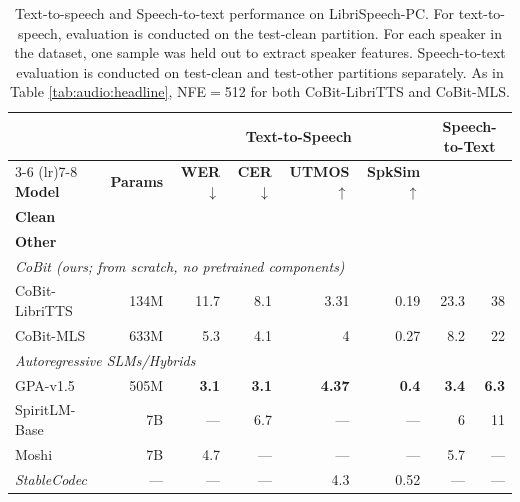 \begin{table}[t]
\centering
\small
\setlength{\tabcolsep}{4.5pt}
\begin{tabular}{lrrrrrrr}
\toprule
& & \multicolumn{4}{c}{\textbf{Text-to-Speech}} & \multicolumn{2}{c}{\textbf{Speech-to-Text}} \\
\cmidrule(lr){3-6} \cmidrule(lr){7-8}
\textbf{Model} & \textbf{Params} & \textbf{WER}$\downarrow$ & \textbf{CER}$\downarrow$ & \textbf{UTMOS}$\uparrow$ & \textbf{SpkSim}$\uparrow$ & \makecell{\textbf{WER}$\downarrow$ \\ \textbf{Clean}} & \makecell{\textbf{WER}$\downarrow$ \\ \textbf{Other}} \\
\midrule
\multicolumn{8}{l}{\emph{CoBit (ours; from scratch, no pretrained components)}} \\
CoBit-LibriTTS & 134M & 11.7 & 8.1 & 3.31 & 0.19 & 23.3 & 38 \\
CoBit-MLS & 633M & 5.3 & 4.1 & 4 & 0.27 & 8.2 & 22 \\
\midrule
\multicolumn{8}{l}{\emph{Autoregressive SLMs/Hybrids}} \\
GPA-v1.5 \citep{audio:gpa} & 505M & \textbf{3.1} & \textbf{3.1} & \textbf{4.37} & \textbf{0.4} & \textbf{3.4} & \textbf{6.3} \\
SpiritLM-Base & 7B & --- & 6.7 & --- & --- & 6 & 11 \\
Moshi \citep{audio:moshi} & 7B & 4.7 & --- & --- & --- & 5.7 &  --- \\
\midrule
\emph{StableCodec} & --- & --- & --- & 4.3 & 0.52 & --- & --- \\
\bottomrule
\end{tabular}
\caption{Text-to-speech and Speech-to-text performance on LibriSpeech-PC. For text-to-speech, evaluation is conducted on the test-clean partition. For each speaker in the dataset, one sample was held out to extract speaker features. Speech-to-text evaluation is conducted on test-clean and test-other partitions separately. As in Table \ref{tab:audio:headline}, NFE$=$512 for both CoBit-LibriTTS and CoBit-MLS.}
\label{tab:audio:cross-modal}
\end{table}

